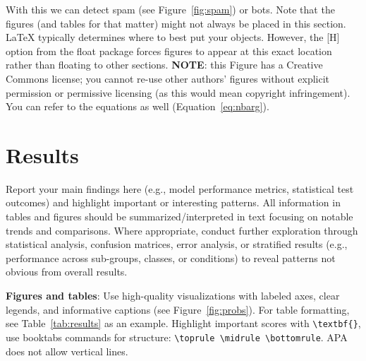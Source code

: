 \documentclass[11pt, a4paper]{article}
\begin{document}
With this we can detect spam (see Figure~\ref{fig:spam}) or bots.  Note that the figures (and tables for that matter) might not always be placed in this section. \LaTeX{} typically determines where to best put your objects. However, the [H] option from the float package forces figures to appear at this exact location rather than floating to other sections. \textbf{NOTE}: this Figure has a Creative Commons license; you cannot re-use other authors' figures without explicit permission or permissive licensing (as this would mean copyright infringement). You can refer to the equations as well (Equation~\ref{eq:nbarg}).

\section{Results}

Report your main findings here (e.g., model performance metrics, statistical test outcomes) and highlight important or interesting patterns. All information in tables and figures should be summarized/interpreted in text focusing on notable trends and comparisons.
Where appropriate, conduct further exploration through statistical analysis, confusion matrices, error analysis, or stratified results (e.g., performance across sub-groups, classes, or conditions) to reveal patterns not obvious from overall results.

\textbf{Figures and tables}: Use high-quality visualizations with labeled axes, clear legends, and informative captions (see Figure~\ref{fig:probs}). For table formatting, see Table~\ref{tab:results} as an example. Highlight important scores with \verb|\textbf{}|, use booktabs commands for structure: \verb|\toprule \midrule \bottomrule|. APA does not allow vertical lines.
\end{document}
